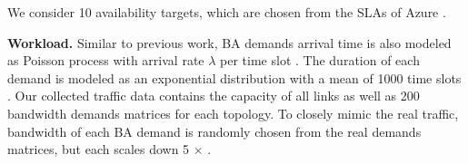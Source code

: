 \documentclass[sigconf]{acmart}
\begin{document}
We consider 10 availability targets, which are chosen from the SLAs of Azure \cite{azure}.


\textbf{Workload.} 
Similar to previous work\cite{OWAN,Guaranteeings,Online-deadline,Teavar}, 
BA demands arrival time is also modeled as Poisson process with arrival rate $\lambda$ per time slot \cite{Guaranteeings,Online-deadline}.
The duration of each demand is modeled as an exponential distribution with a mean of 1000 time slots \cite{Guaranteeings}.
Our collected traffic data contains the capacity of all links as well as 200 bandwidth demands matrices for each topology.
To closely mimic the real traffic, bandwidth of each BA demand is randomly chosen from the real demands matrices, but each scales down 5 $\times$ \cite{Teavar}.



\end{document}
